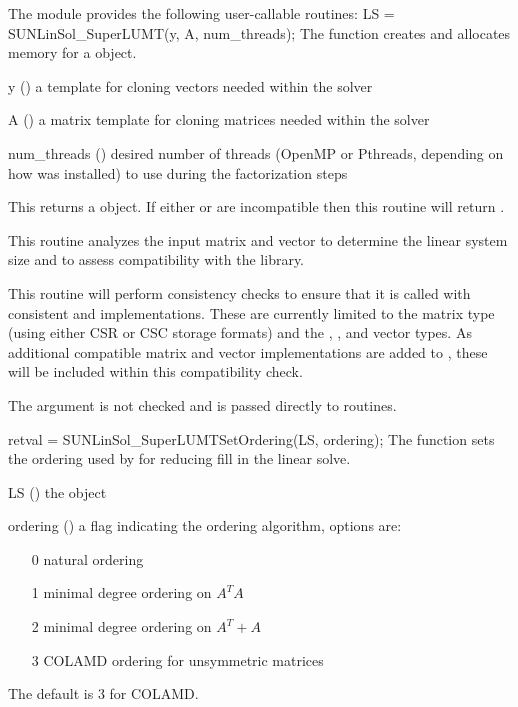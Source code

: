 The module {\sunlinsolslumt} provides the following user-callable routines: 
{
  LS = SUNLinSol\_SuperLUMT(y, A, num\_threads);
}
{
  The function  creates and allocates memory for a
  {\sunlinsolslumt} object.
}
{
  \begin{args}
  \item[y] ()
    a template for cloning vectors needed within the solver
  \item[A] ()
    a {\sunmatsparse} matrix template for cloning matrices needed
    within the solver 
  \item[num\_threads] ()
    desired number of threads (OpenMP or Pthreads, depending on how
    {\superlumt} was installed) to use during the factorization steps
  \end{args}
}
{
  This returns a  object.  If either  or
   are incompatible then this routine will return .
}
{
  This routine analyzes the input matrix and vector to determine the
  linear system size and to assess compatibility with the {\superlumt}
  library.

  This routine will perform consistency checks to ensure that it is
  called with consistent {\nvector} and {\sunmatrix} implementations.
  These are currently limited to the {\sunmatsparse} matrix type
  (using either CSR or CSC storage formats) and the {\nvecs},
  {\nvecopenmp}, and {\nvecpthreads} vector types.  As additional
  compatible matrix and vector implementations are added to
  {\sundials}, these will be included within this compatibility
  check.

  The  argument is not checked and is passed directly
  to {\superlumt} routines. 
}
{
  retval = SUNLinSol\_SuperLUMTSetOrdering(LS, ordering);
}
{
  The function  sets the ordering
  used by {\superlumt} for reducing fill in the linear solve.
}
{
  \begin{args}[ordering]
  \item[LS] ()
    the {\sunlinsolslumt} object
  \item[ordering] ()
    a flag indicating the ordering algorithm, options are:
    \begin{itemize}
    \item[0] natural ordering
    \item[1] minimal degree ordering on $A^TA$
    \item[2] minimal degree ordering on $A^T+A$
    \item[3] COLAMD ordering for unsymmetric matrices
    \end{itemize}
    The default is 3 for COLAMD.
  \end{args}
}
